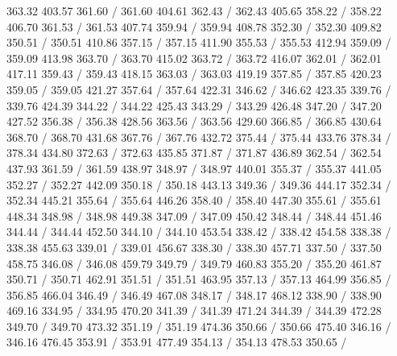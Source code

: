 { 363.32 403.57 361.60 /
 361.60 404.61 362.43 /
 362.43 405.65 358.22 /
 358.22 406.70 361.53 /
 361.53 407.74 359.94 /
 359.94 408.78 352.30 /
 352.30 409.82 350.51 /
 350.51 410.86 357.15 /
 357.15 411.90 355.53 /
 355.53 412.94 359.09 /
 359.09 413.98 363.70 /
 363.70 415.02 363.72 /
 363.72 416.07 362.01 /
 362.01 417.11 359.43 /
 359.43 418.15 363.03 /
 363.03 419.19 357.85 /
 357.85 420.23 359.05 /
 359.05 421.27 357.64 /
 357.64 422.31 346.62 /
 346.62 423.35 339.76 /
 339.76 424.39 344.22 /
 344.22 425.43 343.29 /
 343.29 426.48 347.20 /
 347.20 427.52 356.38 /
 356.38 428.56 363.56 /
 363.56 429.60 366.85 /
 366.85 430.64 368.70 /
 368.70 431.68 367.76 /
 367.76 432.72 375.44 /
 375.44 433.76 378.34 /
 378.34 434.80 372.63 /
 372.63 435.85 371.87 /
 371.87 436.89 362.54 /
 362.54 437.93 361.59 /
 361.59 438.97 348.97 /
 348.97 440.01 355.37 /
 355.37 441.05 352.27 /
 352.27 442.09 350.18 /
 350.18 443.13 349.36 /
 349.36 444.17 352.34 /
 352.34 445.21 355.64 /
 355.64 446.26 358.40 /
 358.40 447.30 355.61 /
 355.61 448.34 348.98 /
 348.98 449.38 347.09 /
 347.09 450.42 348.44 /
 348.44 451.46 344.44 /
 344.44 452.50 344.10 /
 344.10 453.54 338.42 /
 338.42 454.58 338.38 /
 338.38 455.63 339.01 /
 339.01 456.67 338.30 /
 338.30 457.71 337.50 /
 337.50 458.75 346.08 /
 346.08 459.79 349.79 /
 349.79 460.83 355.20 /
 355.20 461.87 350.71 /
 350.71 462.91 351.51 /
 351.51 463.95 357.13 /
 357.13 464.99 356.85 /
 356.85 466.04 346.49 /
 346.49 467.08 348.17 /
 348.17 468.12 338.90 /
 338.90 469.16 334.95 /
 334.95 470.20 341.39 /
 341.39 471.24 344.39 /
 344.39 472.28 349.70 /
 349.70 473.32 351.19 /
 351.19 474.36 350.66 /
 350.66 475.40 346.16 /
 346.16 476.45 353.91 /
 353.91 477.49 354.13 /
 354.13 478.53 350.65 /
}
